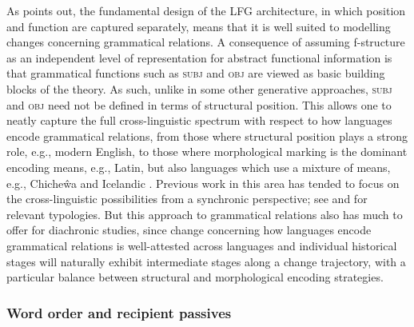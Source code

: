 \documentclass[output=paper,hidelinks]{langscibook}
\begin{document}
As \citet{vincent2001lfg} points out, the fundamental design of the LFG architecture, in which position and function are captured separately, means that it is well suited to modelling changes concerning grammatical relations. A consequence of assuming f-structure as an independent level of representation for abstract functional information is that grammatical functions such as \textsc{subj} and \textsc{obj} are viewed as basic building blocks of the theory. %
As such, unlike in some other generative approaches, \textsc{subj} and \textsc{obj} need not be   defined in terms of structural position. This allows one to neatly capture the full cross-linguistic spectrum with respect to how languages encode grammatical relations, from those where structural position plays a strong role, e.g., modern English, to those where morphological marking is the dominant encoding means, e.g., Latin, but also languages which use a mixture of means, e.g., Chiche{\^w}a \citep{BM87} and  Icelandic \citep{ZMT85:Case}.
Previous work in this area has tended to focus on the cross-linguistic possibilities from a synchronic perspective; see \citet{nordlinger1998constructive} and \citet{Snijders2015} for relevant typologies. But this approach to grammatical relations also has much to offer for diachronic studies, since change concerning how languages encode grammatical relations is well-attested across languages \citep[e.g.,][]{kips97,hewson2006case,ponti2018non} and individual historical stages will naturally exhibit intermediate stages along a change trajectory, with a particular balance between  structural and morphological encoding strategies. 




\subsubsection{Word order and recipient passives}\label{subsect:recip-pass}
\end{document}
